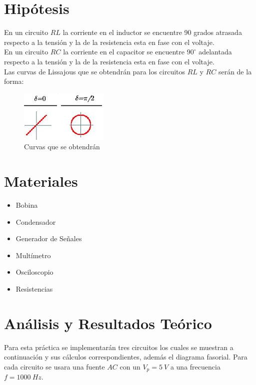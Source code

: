 \documentclass[twocolumn]{IEEEtran}
\begin{document}
\section{Hipótesis}
En un circuito $RL$ la corriente en el inductor se encuentre 90 grados atrasada respecto a la tensión y la de la resistencia esta en fase con el voltaje.\\
En un circuito $RC$ la corriente en el capacitor se encuentre $90^\circ$ adelantada respecto a la tensión y la de la resistencia esta en fase con el voltaje.\\
Las curvas de Lissajous que se obtendrán para los circuitos $RL$ y $RC$ serán de la forma:
\begin{figure}[H]
	\centering
		\includegraphics[scale=1]{fig1.png}
	\caption{Curvas que se obtendrán}
	\label{fig11}
\end{figure}

\section{Materiales}
\begin{itemize}
 \item Bobina
 \item Condensador
 \item Generador de Señales
 \item Multímetro
 \item Osciloscopio
 \item Resistencias
\end{itemize}

\section{Análisis y Resultados Teórico}
\noindent
Para esta práctica se implementarán tres circuitos los cuales  se muestran a continuación y sus cálculos correspondientes, además el diagrama fasorial. Para cada circuito se usara una fuente $AC$ con un $V_p=5\ V$  a una frecuencia $f = 1000\ Hz$.
\end{document}
